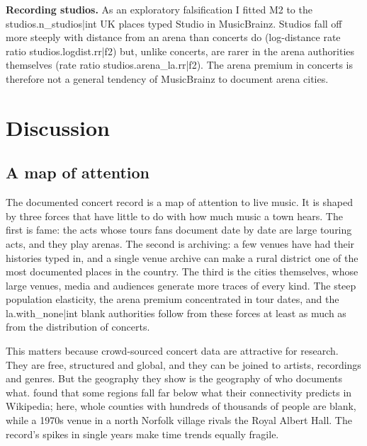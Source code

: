\documentclass[11pt,a4paper]{article}
\begin{document}
\textbf{Recording studios.} As an exploratory falsification I fitted M2 to the {{studios.n_studios|int}} UK places typed Studio in MusicBrainz. Studios fall off more steeply with distance from an arena than concerts do (log-distance rate ratio {{studios.logdist.rr|f2}}) but, unlike concerts, are rarer in the arena authorities themselves (rate ratio {{studios.arena_la.rr|f2}}). The arena premium in concerts is therefore not a general tendency of MusicBrainz to document arena cities.

\section{Discussion}\label{sec:disc}
\subsection{A map of attention}
The documented concert record is a map of attention to live music. It is shaped by three forces that have little to do with how much music a town hears. The first is fame: the acts whose tours fans document date by date are large touring acts, and they play arenas. The second is archiving: a few venues have had their histories typed in, and a single venue archive can make a rural district one of the most documented places in the country. The third is the cities themselves, whose large venues, media and audiences generate more traces of every kind. The steep population elasticity, the arena premium concentrated in tour dates, and the {{la.with_none|int}} blank authorities follow from these forces at least as much as from the distribution of concerts.

This matters because crowd-sourced concert data are attractive for research. They are free, structured and global, and they can be joined to artists, recordings and genres. But the geography they show is the geography of who documents what. \citet{graham2014} found that some regions fall far below what their connectivity predicts in Wikipedia; here, whole counties with hundreds of thousands of people are blank, while a 1970s venue in a north Norfolk village rivals the Royal Albert Hall. The record's spikes in single years make time trends equally fragile.
\end{document}
